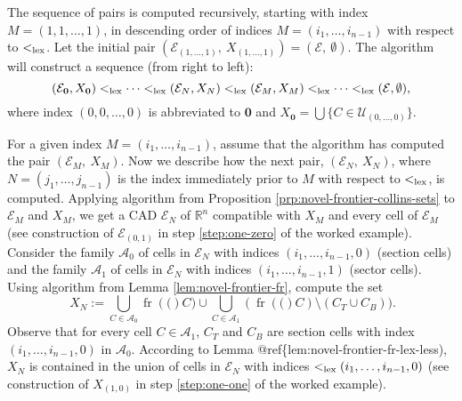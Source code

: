 \documentclass[
]{book}
\theoremstyle{definition}
\theoremstyle{definition}
\theoremstyle{definition}
\theoremstyle{definition}
\theoremstyle{remark}
\begin{document}
The sequence of pairs is computed recursively, starting with index \(M=(1,1, \ldots ,1)\),
in descending order of indices \(M=(i_1, \ldots, i_{n-1})\) with respect to \(<_{\rm{lex}}\).
Let the initial pair \(({\mathcal E}_{(1, \ldots, 1)},\ X_{(1, \ldots, 1)}) = ({\mathcal E},\ \emptyset)\). The algorithm will construct a sequence (from right to left):
\begin{equation}
({\mathcal E}_{\mathbf{0}}, X_{\mathbf{0}}) <_{\rm{lex}}\cdots <_{\rm{lex}}
({\mathcal E}_N, X_N) <_{\rm{lex}}({\mathcal E}_M, X_M)
<_{\rm{lex}}\cdots
<_{\rm{lex}}({\mathcal E} , \emptyset),
\label{eq:sequence}
\end{equation}
where index \((0,0,\ldots,0)\) is abbreviated to \(\mathbf{0}\) and \(X_{\mathbf{0}}= \bigcup \{ C \in{\mathcal U}_{(0, \ldots ,0)} \}\).

For a given index \(M=(i_1,\ldots,i_{n-1})\), assume that the algorithm has computed the pair \((\mathcal{E}_M,\ X_M)\).
Now we describe how the next pair, \(({\mathcal E}_N,\ X_N)\), where \(N=(j_1, \ldots ,j_{n-1})\) is the index immediately prior to \(M\) with respect to \(<_{\rm{lex}}\), is computed.
Applying algorithm from Proposition \ref{prp:novel-frontier-collins-sets} to \({\mathcal E}_M\) and \(X_M\), we get a CAD
\({\mathcal E}_{N}\) of \(\mathbb{R}^n\) compatible with \(X_M\) and every cell of \({\mathcal E}_M\) (see construction of \(\mathcal{E}_{(0,1)}\) in step \ref{step:one-zero} of the worked example).
Consider the family \({\mathcal A}_0\) of cells in \({\mathcal E}_{N}\) with indices \((i_1,\ldots,i_{n-1},0)\)
(section cells)
and the family \({\mathcal A}_1\) of cells in \({\mathcal E}_{N}\) with indices \((i_1,\ldots,i_{n-1},1)\)
(sector cells).
Using algorithm from Lemma \ref{lem:novel-frontier-fr}, compute the set
\begin{equation}\
X_{N}:= \bigcup_{C \in {\mathcal A}_0}{\operatorname{fr} \left( ( \right)}C) \cup \bigcup_{C \in {\mathcal A}_1}({\operatorname{fr} \left( ( \right)}C) \setminus (C_T \cup C_B)).
\label{eq:front}
\end{equation}
Observe that for every cell \(C \in {\mathcal A}_1\), \(C_T\) and \(C_B\) are section cells with index \((i_1,\ldots,i_{n-1},0)\) in \({\mathcal A}_0\).
According to Lemma @ref\{lem:novel-frontier-fr-lex-less), \(X_{N}\) is contained in the union of cells in \({\mathcal E}_{N}\)
with indices \(<_{\rm{lex}}(i_1,\ldots,i_{n-1},0)\) (see construction of \(X_{(1,0)}\) in step \ref{step:one-one} of the worked example).
\end{document}
